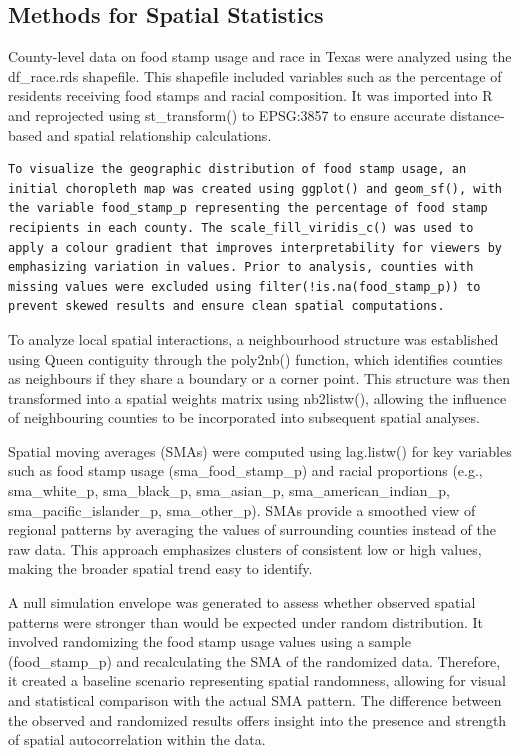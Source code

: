 \documentclass[
]{article}
\begin{document}
\subsection{Methods for Spatial
Statistics}\label{methods-for-spatial-statistics}

County-level data on food stamp usage and race in Texas were analyzed
using the df\_race.rds shapefile. This shapefile included variables such
as the percentage of residents receiving food stamps and racial
composition. It was imported into R and reprojected using
st\_transform() to EPSG:3857 to ensure accurate distance-based and
spatial relationship calculations.

\begin{verbatim}
To visualize the geographic distribution of food stamp usage, an initial choropleth map was created using ggplot() and geom_sf(), with the variable food_stamp_p representing the percentage of food stamp recipients in each county. The scale_fill_viridis_c() was used to apply a colour gradient that improves interpretability for viewers by emphasizing variation in values. Prior to analysis, counties with missing values were excluded using filter(!is.na(food_stamp_p)) to prevent skewed results and ensure clean spatial computations.
\end{verbatim}

To analyze local spatial interactions, a neighbourhood structure was
established using Queen contiguity through the poly2nb() function, which
identifies counties as neighbours if they share a boundary or a corner
point. This structure was then transformed into a spatial weights matrix
using nb2listw(), allowing the influence of neighbouring counties to be
incorporated into subsequent spatial analyses.

Spatial moving averages (SMAs) were computed using lag.listw() for key
variables such as food stamp usage (sma\_food\_stamp\_p) and racial
proportions (e.g., sma\_white\_p, sma\_black\_p, sma\_asian\_p,
sma\_american\_indian\_p, sma\_pacific\_islander\_p, sma\_other\_p).
SMAs provide a smoothed view of regional patterns by averaging the
values of surrounding counties instead of the raw data. This approach
emphasizes clusters of consistent low or high values, making the broader
spatial trend easy to identify.

A null simulation envelope was generated to assess whether observed
spatial patterns were stronger than would be expected under random
distribution. It involved randomizing the food stamp usage values using
a sample (food\_stamp\_p) and recalculating the SMA of the randomized
data. Therefore, it created a baseline scenario representing spatial
randomness, allowing for visual and statistical comparison with the
actual SMA pattern. The difference between the observed and randomized
results offers insight into the presence and strength of spatial
autocorrelation within the data.
\end{document}

